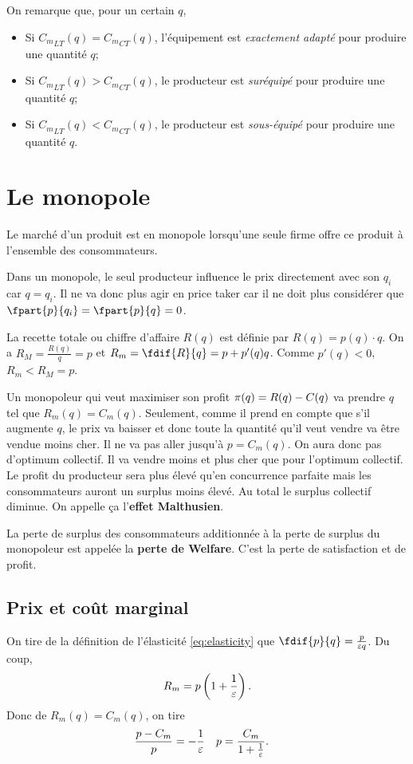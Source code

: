 On remarque que, pour un certain $q$,
\begin{itemize}
  \item Si ${C_m}_{LT}(q) = {C_m}_{CT}(q)$,
    l'équipement est \emph{exactement adapté} pour produire une quantité $q$;
  \item Si ${C_m}_{LT}(q) > {C_m}_{CT}(q)$,
    le producteur est \emph{suréquipé} pour produire une quantité $q$;
  \item Si ${C_m}_{LT}(q) < {C_m}_{CT}(q)$,
    le producteur est \emph{sous-équipé} pour produire une quantité $q$.
\end{itemize}

\section{Le monopole}
Le marché d'un produit est en monopole lorsqu'une seule firme
offre ce produit à l'ensemble des consommateurs.

Dans un monopole,
le seul producteur influence le prix directement avec son $q_i$ car $q = q_i$.
Il ne va donc plus agir en price taker car il ne doit plus
considérer que $\fpart{p}{q_i} = \fpart{p}{q} = 0$.

La recette totale ou chiffre d'affaire $R(q)$ est définie par
$R(q) = p(q) \cdot q$.
On a $R_M = \frac{R(q)}{q} = p$ et $R_m = \fdif{R}{q} = p + p'(q)q$.
Comme $p'(q) < 0$, $R_m < R_M = p$.

Un monopoleur qui veut maximiser son profit $\pi(q) = R(q) - C(q)$
va prendre $q$ tel que $R_m(q) = C_m(q)$.
Seulement, comme il prend en compte que s'il augmente $q$,
le prix va baisser et donc toute la quantité qu'il veut vendre va être vendue
moins cher.
Il ne va pas aller jusqu'à $p = C_m(q)$. On aura donc pas d'optimum collectif.
Il va vendre moins et plus cher que pour l'optimum collectif.
Le profit du producteur sera plus élevé qu'en concurrence parfaite mais
les consommateurs auront un surplus moins élevé.
Au total le surplus collectif diminue.
On appelle ça l'\textbf{effet Malthusien}.

La perte de surplus des consommateurs additionnée à la perte de surplus
du monopoleur est appelée la \textbf{perte de Welfare}.
C'est la perte de satisfaction et de profit.

\subsection{Prix et coût marginal}
On tire de la définition de l'élasticité \eqref{eq:elasticity} que
$\fdif{p}{q} = \frac{p}{\elasticity q}$. Du coup,
\[ R_m = p\left(1+\frac{1}{\varepsilon}\right). \]
Donc de $R_m(q) = C_m(q)$, on tire
\begin{align*}
  \frac{p-C_m}{p} & = -\frac{1}{\varepsilon} &
  p & = \frac{C_m}{1+\frac{1}{\varepsilon}}.
\end{align*}

